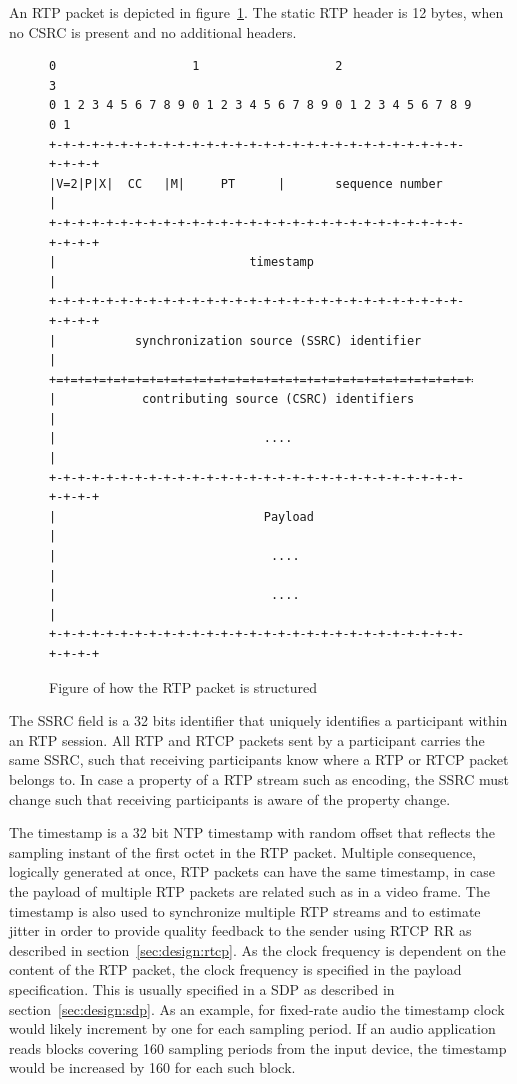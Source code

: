 An RTP packet is depicted in figure~\ref{fig:design:rtppacket}. The static RTP header is 12 bytes, when no CSRC is present and no additional headers.

\begin{figure}[H]
\centering
\begin{verbatim}
0                   1                   2                   3
0 1 2 3 4 5 6 7 8 9 0 1 2 3 4 5 6 7 8 9 0 1 2 3 4 5 6 7 8 9 0 1
+-+-+-+-+-+-+-+-+-+-+-+-+-+-+-+-+-+-+-+-+-+-+-+-+-+-+-+-+-+-+-+-+
|V=2|P|X|  CC   |M|     PT      |       sequence number         |
+-+-+-+-+-+-+-+-+-+-+-+-+-+-+-+-+-+-+-+-+-+-+-+-+-+-+-+-+-+-+-+-+
|                           timestamp                           |
+-+-+-+-+-+-+-+-+-+-+-+-+-+-+-+-+-+-+-+-+-+-+-+-+-+-+-+-+-+-+-+-+
|           synchronization source (SSRC) identifier            |
+=+=+=+=+=+=+=+=+=+=+=+=+=+=+=+=+=+=+=+=+=+=+=+=+=+=+=+=+=+=+=+=+
|            contributing source (CSRC) identifiers             |
|                             ....                              |
+-+-+-+-+-+-+-+-+-+-+-+-+-+-+-+-+-+-+-+-+-+-+-+-+-+-+-+-+-+-+-+-+
|                             Payload                           |
|                              ....                             |
|                              ....                             |
+-+-+-+-+-+-+-+-+-+-+-+-+-+-+-+-+-+-+-+-+-+-+-+-+-+-+-+-+-+-+-+-+
\end{verbatim}
\caption{Figure of how the RTP packet is structured\citep{RFC3550}}
\label{fig:design:rtppacket}
\end{figure}

The \ac{SSRC} field is a 32 bits identifier that uniquely identifies a participant within an RTP session. All RTP and RTCP packets sent by a participant carries the same SSRC, such that receiving participants know where a RTP or RTCP packet belongs to. In case a property of a RTP stream such as encoding, the SSRC must change such that receiving participants is aware of the property change.

The timestamp is a 32 bit NTP timestamp with random offset that reflects the sampling instant of the first octet in the RTP packet. Multiple consequence, logically generated at once, RTP packets can have the same timestamp, in case the payload of multiple RTP packets are related such as in a video frame.
The timestamp is also used to synchronize multiple RTP streams and to estimate jitter in order to provide quality feedback to the sender using RTCP RR as described in section~\ref{sec:design:rtcp}.
As the clock frequency is dependent on the content of the RTP packet, the clock frequency is specified in the payload specification. This is usually specified in a SDP as described in section~\ref{sec:design:sdp}. As an example, for fixed-rate audio the timestamp clock would likely increment by one for each sampling period. If an audio application reads blocks covering 160 sampling periods from the input device, the timestamp would be increased by 160 for each such block\citep{RFC3550}.


